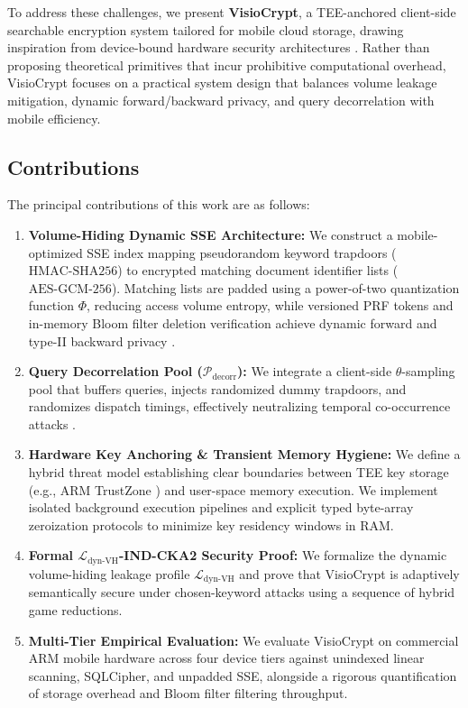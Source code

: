 \documentclass[runningheads]{llncs}
\begin{document}
To address these challenges, we present \textbf{VisioCrypt}, a TEE-anchored client-side searchable encryption system tailored for mobile cloud storage, drawing inspiration from device-bound hardware security architectures \cite{hossain2026visiolock,rustee2020}. Rather than proposing theoretical primitives that incur prohibitive computational overhead, VisioCrypt focuses on a practical system design that balances volume leakage mitigation, dynamic forward/backward privacy, and query decorrelation with mobile efficiency.

\subsection{Contributions}
The principal contributions of this work are as follows:
\begin{enumerate}
    \item \textbf{Volume-Hiding Dynamic SSE Architecture:} We construct a mobile-optimized SSE index mapping pseudorandom keyword trapdoors ($\text{HMAC-SHA256}$) to encrypted matching document identifier lists ($\text{AES-GCM-256}$). Matching lists are padded using a power-of-two quantization function $\Phi$, reducing access volume entropy, while versioned PRF tokens and in-memory Bloom filter deletion verification achieve dynamic forward and type-II backward privacy \cite{pets2023_dynamic_vh,sgxse2_2020}.
    \item \textbf{Query Decorrelation Pool ($\mathcal{P}_{\text{decorr}}$):} We integrate a client-side $\theta$-sampling pool that buffers queries, injects randomized dummy trapdoors, and randomizes dispatch timings, effectively neutralizing temporal co-occurrence attacks \cite{swat2024}.
    \item \textbf{Hardware Key Anchoring \& Transient Memory Hygiene:} We define a hybrid threat model establishing clear boundaries between TEE key storage (e.g., ARM TrustZone \cite{pinto2019,rustee2020}) and user-space memory execution. We implement isolated background execution pipelines and explicit typed byte-array zeroization protocols to minimize key residency windows in RAM.
    \item \textbf{Formal $\mathcal{L}_{\text{dyn-VH}}$-IND-CKA2 Security Proof:} We formalize the dynamic volume-hiding leakage profile $\mathcal{L}_{\text{dyn-VH}}$ and prove that VisioCrypt is adaptively semantically secure under chosen-keyword attacks using a sequence of hybrid game reductions.
    \item \textbf{Multi-Tier Empirical Evaluation:} We evaluate VisioCrypt on commercial ARM mobile hardware across four device tiers against unindexed linear scanning, SQLCipher, and unpadded SSE, alongside a rigorous quantification of storage overhead and Bloom filter filtering throughput.
\end{enumerate}
\end{document}
